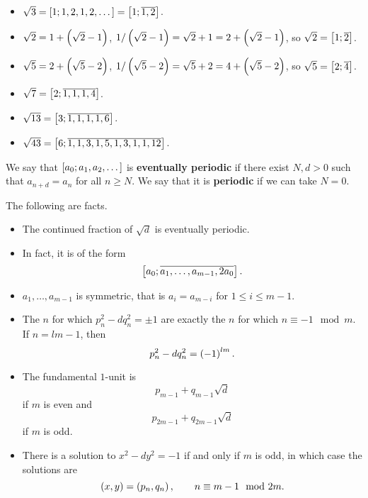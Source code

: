 \begin{example*}
\hfill
\begin{itemize}
\item $ \sqrt{3} = \sbr{1; 1, 2, 1, 2, \dots} = \sbr{1; \overline{1, 2}} $.
\item $ \sqrt{2} = 1 + \br{\sqrt{2} - 1} $, $ 1 / \br{\sqrt{2} - 1} = \sqrt{2} + 1 = 2 + \br{\sqrt{2} - 1} $, so $ \sqrt{2} = \sbr{1; \overline{2}} $.
\item $ \sqrt{5} = 2 + \br{\sqrt{5} - 2} $, $ 1 / \br{\sqrt{5} - 2} = \sqrt{5} + 2 = 4 + \br{\sqrt{5} - 2} $, so $ \sqrt{5} = \sbr{2; \overline{4}} $.
\item $ \sqrt{7} = \sbr{2; \overline{1, 1, 1, 4}} $.
\item $ \sqrt{13} = \sbr{3; \overline{1, 1, 1, 1, 6}} $.
\item $ \sqrt{43} = \sbr{6; \overline{1, 1, 3, 1, 5, 1, 3, 1, 1, 12}} $.
\end{itemize}
\end{example*}

\begin{definition}
We say that $ \sbr{a_0; a_1, a_2, \dots} $ is \textbf{eventually periodic} if there exist $ N, d > 0 $ such that $ a_{n + d} = a_n $ for all $ n \ge N $. We say that it is \textbf{periodic} if we can take $ N = 0 $.
\end{definition}

\begin{remark}
The following are facts.
\begin{itemize}
\item The continued fraction of $ \sqrt{d} $ is eventually periodic.
\item In fact, it is of the form
$$ \sbr{a_0; \overline{a_1, \dots, a_{m - 1}, 2a_0}}. $$
\item $ a_1, \dots, a_{m - 1} $ is symmetric, that is $ a_i = a_{m - i} $ for $ 1 \le i \le m - 1 $.
\item The $ n $ for which $ p_n^2 - dq_n^2 = \pm 1 $ are exactly the $ n $ for which $ n \equiv -1 \mod m $. If $ n = lm - 1 $, then
$$ p_n^2 - dq_n^2 = \br{-1}^{lm}. $$
\item The fundamental $ 1 $-unit is
$$ p_{m - 1} + q_{m - 1}\sqrt{d} $$
if $ m $ is even and
$$ p_{2m - 1} + q_{2m - 1}\sqrt{d} $$
if $ m $ is odd.
\item There is a solution to $ x^2 - dy^2 = -1 $ if and only if $ m $ is odd, in which case the solutions are
$$ \br{x, y} = \br{p_n, q_n}, \qquad n \equiv m - 1 \mod 2m. $$
\end{itemize}
\end{remark}

